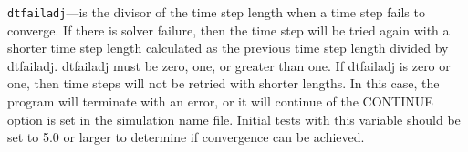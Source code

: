 \begin{description}
\item \texttt{dtfailadj}---is the divisor of the time step length when a time step fails to converge.  If there is solver failure, then the time step will be tried again with a shorter time step length calculated as the previous time step length divided by dtfailadj.  dtfailadj must be zero, one, or greater than one.  If dtfailadj is zero or one, then time steps will not be retried with shorter lengths.  In this case, the program will terminate with an error, or it will continue of the CONTINUE option is set in the simulation name file.  Initial tests with this variable should be set to 5.0 or larger to determine if convergence can be achieved.

\end{description}

